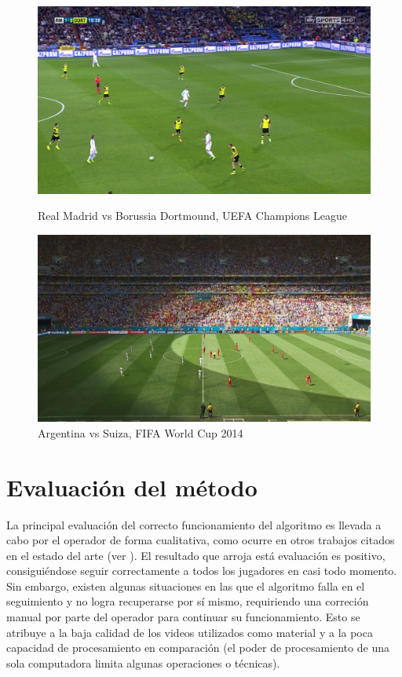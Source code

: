 \begin{figure}[H]
    \centering
    \begin{minipage}[t]{.45\textwidth}
        \centering
        \includegraphics[width=\linewidth]{./images/realmadrid1.png}
        \caption{Real Madrid vs Borussia Dortmound, UEFA Champions League
        \label{fig:realmadrid}}
    \end{minipage}%
    \vspace{0.1cm}
    \begin{minipage}[t]{.45\textwidth}
        \centering
        \includegraphics[width=\linewidth]{./images/argentina1.png}
        \caption{Argentina vs Suiza, FIFA World Cup 2014
        \label{fig:argentina1}}
    \end{minipage}
\end{figure}

\section{Evaluación del método}

La principal evaluación del correcto funcionamiento del algoritmo es llevada a
cabo por el operador de forma cualitativa, como ocurre en otros trabajos
citados en el estado del arte (ver \cite{papers-tanos}). El resultado que
arroja está evaluación es positivo, consiguiéndose seguir correctamente a
todos los jugadores en casi todo momento. Sin embargo, existen algunas
situaciones en las que el algoritmo falla en el seguimiento y no logra
recuperarse por sí mismo, requiriendo una correción manual por parte del
operador para continuar su funcionamiento. Esto se atribuye a la baja calidad
de los videos utilizados como material y a la poca capacidad de procesamiento
en comparación (el poder de procesamiento de una sola computadora limita
algunas operaciones o técnicas).

